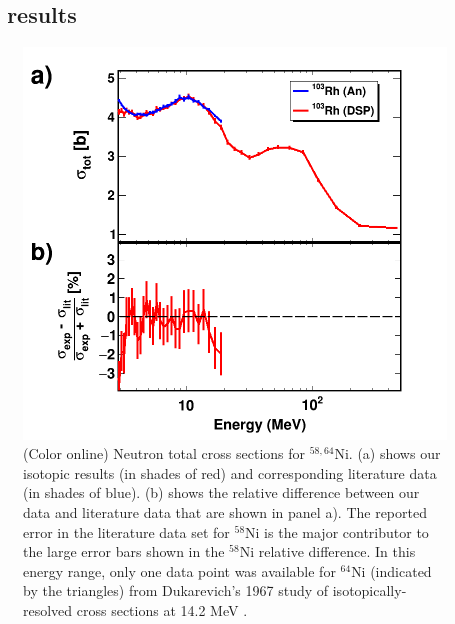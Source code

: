 \subsection{\rhThree\ \tot\ results}
\begin{figure}
    \includegraphics[scale=0.35]{figures/TwoPanelRh.png}
    \caption{(Color online) Neutron total cross sections for $^{58,64}$Ni.
        (a) shows our isotopic results (in shades of red) and
        corresponding literature data \cite{Perey1993, Dukarevich1967} (in
        shades of blue). (b) shows the relative difference between our data
        and literature data that are shown in panel a). The reported error in
        the literature data set for $^{58}$Ni is the major contributor to the
        large error bars shown in the $^{58}$Ni relative difference. In this
        energy range, only one data point was available for $^{64}$Ni (indicated
        by the triangles) from Dukarevich's 1967 study of isotopically-resolved cross
        sections at 14.2 MeV \cite{Dukarevich1967}.
    }
    \label{TwoPanelRh}
\end{figure}


